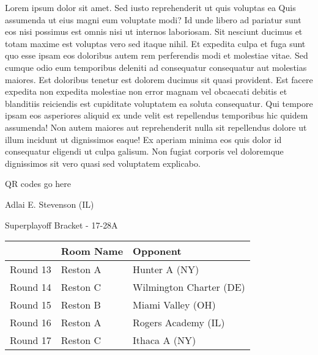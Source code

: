 \documentclass{article}%
\begin{document}
\vspace*{8pt}%
\linebreak%
\newline%
\newline%
Lorem ipsum dolor sit amet. Sed iusto reprehenderit ut quis voluptas ea Quis assumenda ut eius magni eum voluptate modi? Id unde libero ad pariatur sunt eos nisi possimus est omnis nisi ut internos laboriosam. Sit nesciunt ducimus et totam maxime est voluptas vero sed itaque nihil. Et expedita culpa et fuga sunt quo esse ipsam eos doloribus autem rem perferendis modi et molestiae vitae.\newline%
\newline%
Sed cumque odio eum temporibus deleniti ad consequatur consequatur aut molestias maiores. Est doloribus tenetur est dolorem ducimus sit quasi provident. Est facere expedita non expedita molestiae non error magnam vel obcaecati debitis et blanditiis reiciendis est cupiditate voluptatem ea soluta consequatur. Qui tempore ipsam eos asperiores aliquid ex unde velit est repellendus temporibus hic quidem assumenda!\newline%
\newline%
Non autem maiores aut reprehenderit nulla sit repellendus dolore ut illum incidunt ut dignissimos eaque! Ex aperiam minima eos quis dolor id consequatur eligendi ut culpa galisum. Non fugiat corporis vel doloremque dignissimos sit vero quasi sed voluptatem explicabo.\newline%
\newline%
%
\vspace*{30pt}%
\begin{center}%
\begin{Huge}%
QR codes go here%
\end{Huge}%
\end{center}%
\newpage%
\begin{center}%
\begin{Huge}%
Adlai E. Stevenson (IL)%
\end{Huge}%
\vspace*{8pt}%
\linebreak%
\begin{Large}%
Superplayoff Bracket {-} 17{-}28A%
\end{Large}%
\end{center}%
%
\begin{tabularx}{\textwidth}{|c|Y|Y|}%
\hline%
&Room Name&Opponent\\%
\hline%
Round 13&Reston A&Hunter A (NY)\\%
Round 14&Reston C&Wilmington Charter (DE)\\%
Round 15&Reston B&Miami Valley (OH)\\%
Round 16&Reston A&Rogers Academy (IL)\\%
Round 17&Reston C&Ithaca A (NY)\\%
\hline%
\end{tabularx}%
\end{document}
